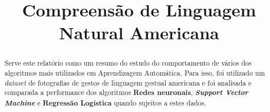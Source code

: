 \documentclass[conference]{IEEEtran}
\begin{document}
\title{Compreensão de Linguagem Natural Americana}

\author{
\and
{}
}

\maketitle

\begin{abstract}
Serve este relatório como um resumo do estudo do comportamento de vários dos algoritmos mais utilizados em Aprendizagem Automática. Para isso, foi utilizado um \textit{dataset} de fotografias de gestos de linguagem gestual americana e foi analisada e comparada a performance dos algoritmos \textbf{Redes neuronais}, \textbf{\textit{Support Vector Machine}} e \textbf{Regressão Logística} quando sujeitos a estes dados.
\end{abstract}












\end{document}
